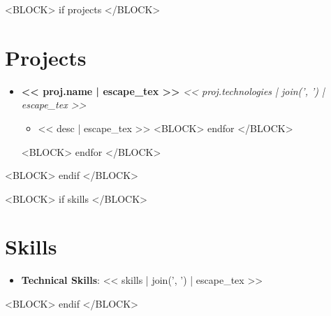 \documentclass[letterpaper,11pt]{article}
\begin{document}
<BLOCK> if projects </BLOCK>
\section{Projects}
  \begin{itemize}[leftmargin=0.15in, label={}]
    <BLOCK> for proj in projects </BLOCK>
    \item
      \textbf{<< proj.name | escape_tex >>} \textit{<< proj.technologies | join(', ') | escape_tex >>} \\
      \begin{itemize}
        <BLOCK> for desc in proj.description </BLOCK>
        \item \small{<< desc | escape_tex >>}
        <BLOCK> endfor </BLOCK>
      \end{itemize}
    <BLOCK> endfor </BLOCK>
  \end{itemize}
<BLOCK> endif </BLOCK>

<BLOCK> if skills </BLOCK>
\section{Skills}
 \begin{itemize}[leftmargin=0.15in, label={}]
    \item{
     \textbf{Technical Skills}{: << skills | join(', ') | escape_tex >>}
    }
 \end{itemize}
<BLOCK> endif </BLOCK>
\end{document}
